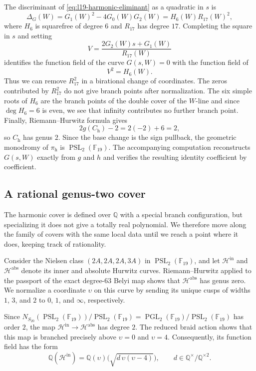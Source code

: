\documentclass[10pt]{amsart}
\numberwithin{equation}{section}
\theoremstyle{definition}
\theoremstyle{remark}
\newcommand{\F}{\mathbb{F}}
\newcommand{\Q}{\mathbb{Q}}
\newcommand{\PGL}{\operatorname{PGL}}
\newcommand{\PSL}{\operatorname{PSL}}
\begin{document}
The discriminant of \eqref{eq:l19-harmonic-eliminant} as a quadratic in
$s$ is
\[
 \Delta_G(W)=G_1(W)^2-4G_0(W)G_2(W)
            =H_6(W)R_{17}(W)^2,
\]
where $H_6$ is squarefree of degree $6$ and $R_{17}$ has degree $17$. Completing the square in $s$ and setting
\[
 V=\frac{2G_2(W)s+G_1(W)}{R_{17}(W)}
\]
identifies the function field of the curve $G(s,W)=0$ with the function field of
\[
 V^2=H_6(W).
\]
Thus we can remove $R_{17}^2$ in a birational change of coordinates. The zeros contributed by $R_{17}^2$ do not give branch points after normalization.  The six simple roots of $H_6$ are the branch points of the
double cover of the $W$-line and since $\deg H_6=6$ is even, we see that infinity contributes no further branch point. Finally, Riemann--Hurwitz formula gives
\[
 2g(C_{\mathrm h})-2=2(-2)+6=2,
\]
so $C_{\mathrm h}$ has genus $2$.  Since the base change is the sign
pullback, the geometric monodromy of $\pi_{\mathrm h}$ is
$\PSL_2(\F_{19})$. The accompanying computation reconstructs $G(s,W)$ exactly from $g$ and $h$ and verifies the resulting identity coefficient by coefficient.










\subsection{A rational genus-two cover}\label{subsec:l19-deformation}
The harmonic cover is defined over $\Q$ with a special branch configuration, but specializing it does not give a totally real polynomial.  We
therefore move along the family of covers with the same local data until we
reach a point where it does, keeping track of rationality.

Consider the Nielsen class $(2A,2A,2A,3A)$ in $\PSL_2(\F_{19})$, and let
  $\mathcal H^{\mathrm{in}}$ and $\mathcal H^{\mathrm{abs}}$ denote its inner
  and absolute Hurwitz curves. Riemann--Hurwitz applied to the passport of the
  exact degree-$63$ Belyi map shows that $\mathcal H^{\mathrm{abs}}$ has genus
  zero. We normalize a coordinate $\upsilon$ on this curve by sending its
  unique cusps of widths $1$, $3$, and $2$ to $0$, $1$, and $\infty$,
  respectively.

  Since $N_{S_{20}}(\PSL_2(\F_{19}))/\PSL_2(\F_{19})=\PGL_2(\F_{19})/\PSL_2(\F_{19})$ has order $2$, the map
  $\mathcal H^{\mathrm{in}}\to\mathcal H^{\mathrm{abs}}$ has degree $2$.
  The reduced braid action shows that this map is branched precisely above
  $\upsilon=0$ and $\upsilon=4$. Consequently, its function field has the
  form
  \[
   \Q(\mathcal H^{\mathrm{in}})
   =\Q(\upsilon)\bigl(\sqrt{d\,\upsilon(\upsilon-4)}\bigr),
   \qquad d\in\Q^\times/\Q^{\times2}.
  \]
\end{document}
